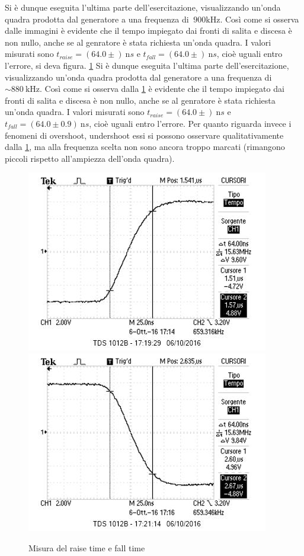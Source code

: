 \documentclass[10pt,a4paper]{article}
\begin{document}
Si è dunque eseguita l'ultima parte dell'esercitazione, visualizzando un'onda quadra prodotta dal generatore a una frequenza di $~900 \text{kHz}$.
Così come si osserva dalle immagini è evidente che il tempo impiegato dai fronti di salita e discesa è non nullo, anche se al genratore è stata richiesta un'onda quadra. I valori misurati sono $t_{raise} = (64.0 \pm )~\text{n}s$ e $t_{fall} = (64.0 \pm )~\text{n}s$, cioè uguali entro l'errore, si deva figura. \figurename{\ref{f:raise}}
Si è dunque eseguita l'ultima parte dell'esercitazione, visualizzando un'onda quadra prodotta dal generatore a una frequenza di $\sim880~\text{kHz}$.
Così come si osserva dalla \figurename{\ref{f:raise}} è evidente che il tempo impiegato dai fronti di salita e discesa è non nullo, anche se al genratore è stata richiesta un'onda quadra. I valori misurati sono $t_{raise} = (64.0 \pm )~\text{n}s$ e $t_{fall} = (64.0 \pm 0.9)~\text{n}s$, cioè uguali entro l'errore. %
Per quanto riguarda invece i fenomeni di overshoot, undershoot essi si possono osservare qualitativamente dalla \figurename{\ref{f:raise}}, ma alla frequenza scelta non sono ancora troppo marcati (rimangono piccoli rispetto all'ampiezza dell'onda quadra).

\begin{figure}[h]
	\centering
	\includegraphics[scale=0.6]{../Oscilloscopio/raise_time.jpg}
	\includegraphics[scale=0.6]{../Oscilloscopio/fall_time.jpg}
	\caption{Misura del raise time e fall time}
	\label{f:raise}
\end{figure}
\end{document}
